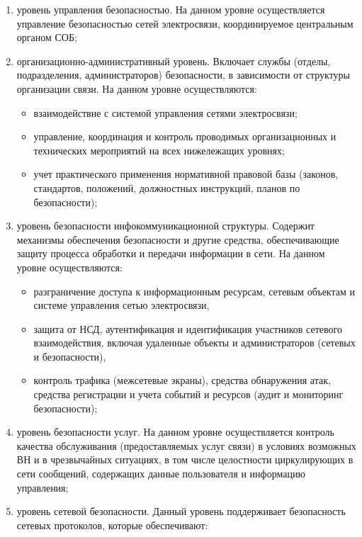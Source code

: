 \documentclass[12pt, russian, oneside, article]{ncc}
\begin{document}
\begin{enumerate}
\item уровень управления безопасностью. На данном уровне осуществляется управление безопасностью сетей электросвязи, координируемое центральным органом СОБ;
\item организационно-административный уровень. Включает службы (отделы, подразделения, администраторов) безопасности, в зависимости от структуры организации связи. На данном уровне осуществляются:

\begin{itemize}
\item взаимодействие с системой управления сетями электросвязи;
\item управление, координация и контроль проводимых организационных и технических мероприятий на всех нижележащих уровнях;
\item учет практического применения нормативной правовой базы (законов, стандартов, положений, должностных инструкций, планов по безопасности);
\end{itemize}

\item уровень безопасности инфокоммуникационной структуры. Содержит механизмы обеспечения безопасности и другие средства, обеспечивающие защиту процесса обработки и передачи информации в сети. На данном уровне осуществляются:

\begin{itemize}
\item разграничение доступа к информационным ресурсам, сетевым объектам и системе управления сетью электросвязи,
\item защита от НСД, аутентификация и идентификация участников сетевого взаимодействия, включая удаленные объекты и администраторов (сетевых и безопасности),
\item контроль трафика (межсетевые экраны), средства обнаружения атак, средства регистрации и учета событий и ресурсов (аудит и мониторинг безопасности);
\end{itemize}

\item уровень безопасности услуг. На данном уровне осуществляется контроль качества обслуживания (предоставляемых услуг связи) в условиях возможных ВН и в чрезвычайных ситуациях, в том числе целостности циркулирующих в сети сообщений, содержащих данные пользователя и информацию управления;
\item уровень сетевой безопасности. Данный уровень поддерживает безопасность сетевых протоколов, которые обеспечивают:


\end{enumerate}
\end{document}
